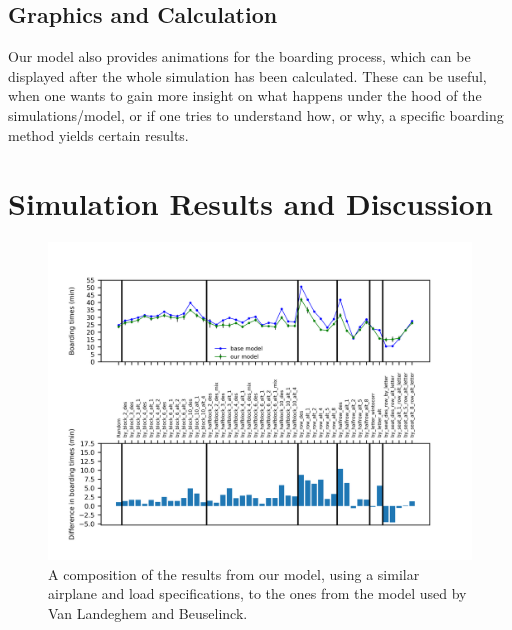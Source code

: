 \documentclass[11pt]{article}
\begin{document}
\subsection{Graphics and Calculation}
Our model also provides animations for the boarding process, which can be displayed after the whole simulation has been calculated. These can be useful, when one wants to gain more insight on what happens under the hood of the simulations/model, or if one tries to understand how, or why, a specific boarding method yields certain results.

 



\section{Simulation Results and Discussion}
\begin{figure}
	\includegraphics[width=\linewidth]{../../code/AirplaneBoarding/data/figure1/figure1.png}
	\caption{A composition of the results from our model, using a similar airplane and load specifications, to the ones from the model used by Van Landeghem and Beuselinck. \cite{beus}}
	\label{figure1}
\end{figure}
\end{document}
